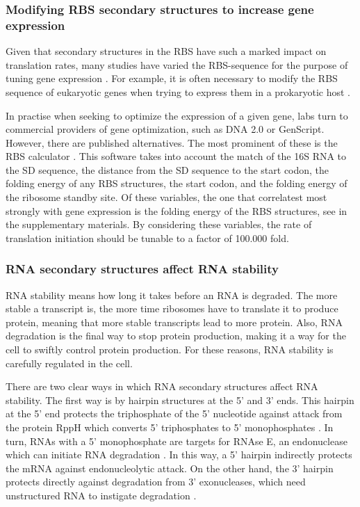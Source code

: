 \subsubsection{Modifying RBS secondary structures to increase gene expression}
Given that secondary structures in the RBS have such a marked impact on
translation rates, many studies have varied the RBS-sequence for the purpose of
tuning gene expression \cite{cebe_rapid_2006} \cite{park_design_2007}
\cite{berg_expression_2009}. For example, it is often necessary to modify the
RBS sequence of eukaryotic genes when trying to express them in a prokaryotic
host \cite{care_translation_2007}.

In practise when seeking to optimize the expression of a given gene, labs turn
to commercial providers of gene optimization, such as DNA 2.0 or GenScript.
However, there are published alternatives. The most prominent of these is the
RBS calculator \cite{salis_automated_2009}. This software takes into account
the match of the 16S RNA to the SD sequence, the distance from the SD sequence
to the start codon, the folding energy of any RBS structures, the start codon,
and the folding energy of the ribosome standby site. Of these variables, the
one that correlatest most strongly with gene expression is the folding energy
of the RBS structures, see \cite{salis_automated_2009} in the supplementary
materials. By considering these variables, the rate of translation initiation
should be tunable to a factor of 100.000 fold.

\subsubsection{RNA secondary structures affect RNA stability}
RNA stability means how long it takes before an RNA is degraded. The more
stable a transcript is, the more time ribosomes have to translate it to produce
protein, meaning that more stable transcripts lead to more protein. Also, RNA
degradation is the final way to stop protein production, making it a way for
the cell to swiftly control protein production. For these reasons, RNA
stability is carefully regulated in the cell.

There are two clear ways in which RNA secondary structures affect RNA stability.
The first way is by hairpin structures at the 5' and 3' ends. This hairpin at
the 5' end protects the triphosphate of the 5' nucleotide against attack from
the protein RppH which converts 5' triphosphates to 5' monophosphates
\cite{deana_bacterial_2008}. In turn, RNAs with a 5' monophosphate are targets
for RNAse E, an endonuclease which can initiate RNA degradation
\cite{mackie_ribonuclease_1998}. In this way, a 5' hairpin indirectly protects
the mRNA against endonucleolytic attack. On the other hand, the 3' hairpin
protects directly against degradation from 3' exonucleases, which need
unstructured RNA to instigate degradation \cite{rauhut_mrna_1999}.

